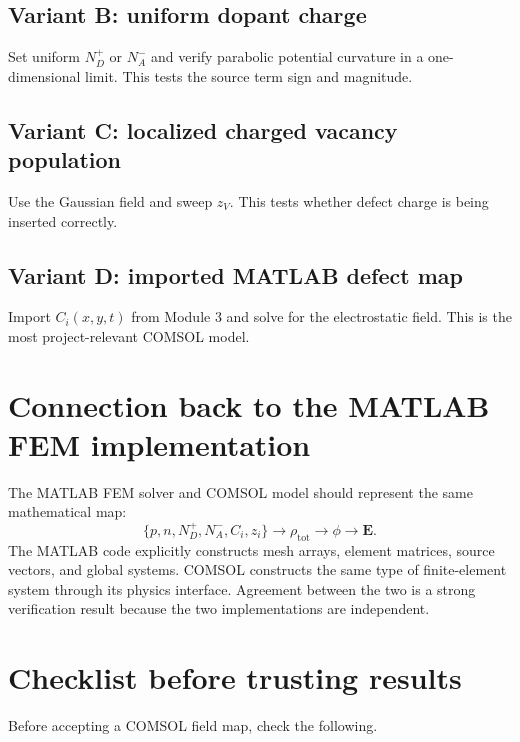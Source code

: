 \documentclass[11pt]{article}
\newcommand{\Evec}{\mathbf{E}}
\newcommand{\code}[1]{\texttt{\detokenize{#1}}}
\begin{document}
\subsection{Variant B: uniform dopant charge}

Set uniform $N_D^+$ or $N_A^-$ and verify parabolic potential curvature in a one-dimensional limit. This tests the source term sign and magnitude.

\subsection{Variant C: localized charged vacancy population}

Use the Gaussian \code{CV} field and sweep $z_V$. This tests whether defect charge is being inserted correctly.

\subsection{Variant D: imported MATLAB defect map}

Import $C_i(x,y,t)$ from Module 3 and solve for the electrostatic field. This is the most project-relevant COMSOL model.

\section{Connection back to the MATLAB FEM implementation}

The MATLAB FEM solver and COMSOL model should represent the same mathematical map:
\begin{equation}
\{p,n,N_D^+,N_A^-,C_i,z_i\}\rightarrow \rho_{\mathrm{tot}}\rightarrow \phi\rightarrow \Evec.
\end{equation}
The MATLAB code explicitly constructs mesh arrays, element matrices, source vectors, and global systems. COMSOL constructs the same type of finite-element system through its physics interface. Agreement between the two is a strong verification result because the two implementations are independent.

\section{Checklist before trusting results}

Before accepting a COMSOL field map, check the following.
\end{document}
